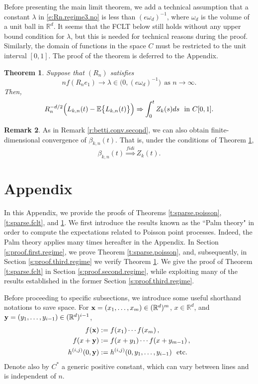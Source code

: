 \documentclass[11pt]{amsart}
\numberwithin{equation}{section}
\theoremstyle{plain}
\newtheorem{theorem}{Theorem}[section]
\theoremstyle{definition}
\newtheorem{remark}[theorem]{Remark}
\begin{document}
Before presenting the main limit theorem, we add a technical assumption that a constant $\lambda$ in \eqref{e:Rn.regime3.no} is less than $(e\omega_d)^{-1}$, where $\omega_d$ is the volume of a unit ball in ${{\mathbb R}}^d$. It seems that the FCLT below still holds without any upper bound condition for $\lambda$, but this is needed for technical reasons during the proof. Similarly, the domain of functions in the space $C$ must be restricted to the unit interval $[0,1]$.
The proof of the theorem is deferred to the Appendix.
\begin{theorem}  \label{t:giant.fclt}
Suppose that $(R_n)$ satisfies
\begin{equation}  \label{e:Rn.regime3}
nf(R_ne_1) \to \lambda \in \bigl(0, (e\omega_d)^{-1} \bigr) \ \ \text{as } n\to\infty.
\end{equation}
Then,
$$
R_n^{-d/2} \Bigl( L_{k,n}(t) - {\mathbb{E}} \bigl\{ L_{k,n}(t) \bigr\}\Bigr) \Rightarrow \int_0^t Z_k(s)ds \ \ \text{in } C[0,1].
$$
\end{theorem}
\begin{remark}
As in Remark \ref{r:betti.conv.second}, we can also obtain finite-dimensional convergence of $\beta_{k,n}(t)$. That is, under the conditions of Theorem \ref{t:giant.fclt},
$$
\beta_{k,n}(t) \stackrel{fidi}{\Rightarrow} Z_k(t).
$$
\end{remark}

\section{Appendix}  \label{s:appendix}

In this Appendix, we provide the proofs of Theorems \ref{t:sparse.poisson}, \ref{t:sparse.fclt}, and \ref{t:giant.fclt}. We first introduce the results known as the ``Palm theory" in order to compute the expectations related to Poisson point processes. Indeed, the Palm theory applies many times hereafter in the Appendix. In Section \ref{s:proof.first.regime}, we prove Theorem \ref{t:sparse.poisson}, and, subsequently, in Section \ref{s:proof.third.regime} we verify Theorem \ref{t:giant.fclt}. We give the proof of  Theorem \ref{t:sparse.fclt} in Section \ref{s:proof.second.regime}, while exploiting many of the results established in the former Section \ref{s:proof.third.regime}.

Before proceeding to specific subsections, we introduce some useful shorthand notations to save space. For ${{\bf x}} = (x_1,\dots,x_m) \in ({{\mathbb R}}^d)^m$, $x \in {{\mathbb R}}^d$, and ${{\bf y}} = (y_1,\dots,y_{i-1})
\in ({{\mathbb R}}^d)^{i-1}$,
\begin{align*}
f({{\bf x}}) &:= f(x_1)\cdots f(x_m)\,, \\
f(x+{{\bf y}}) &:= f(x + y_1)\cdots f(x + y_{m-1})\,, \\
{h^{(i,j)}} (0,{{\bf y}}) &:= {h^{(i,j)}} (0,y_1,\dots,y_{i-1}) \ \ \text{etc.}
\end{align*}
Denote also by $C^*$ a generic positive constant, which can vary between lines and is independent of $n$.
\end{document}
